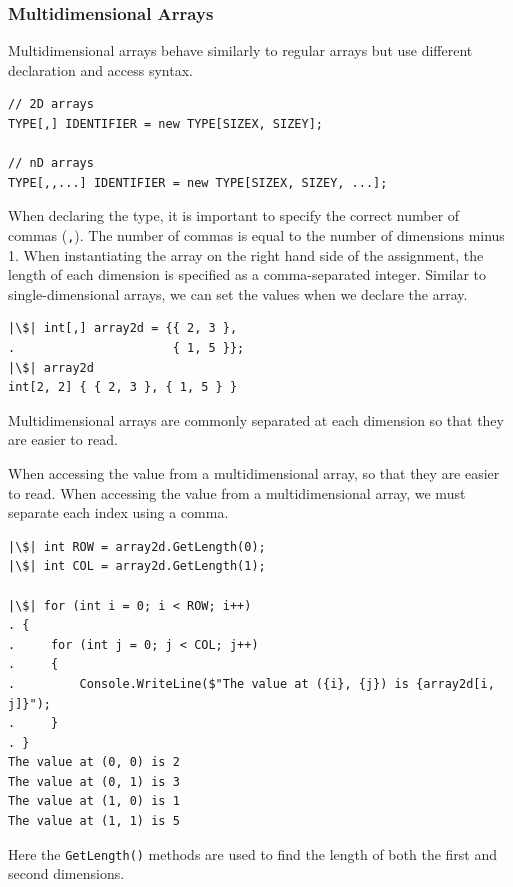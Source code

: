 \documentclass{article}
\begin{document}
\subsubsection{Multidimensional Arrays}
Multidimensional arrays behave similarly to regular arrays but use
different declaration and access syntax.
\begin{verbatim}
// 2D arrays
TYPE[,] IDENTIFIER = new TYPE[SIZEX, SIZEY];

// nD arrays
TYPE[,,...] IDENTIFIER = new TYPE[SIZEX, SIZEY, ...];
\end{verbatim}
When declaring the type, it is important to specify the correct number
of commas (\texttt{,}). The number of commas is equal to
the number of dimensions minus 1. When instantiating the array on the
right hand side of the assignment, the length of each dimension is
specified as a comma-separated integer. Similar to single-dimensional
arrays, we can set the values when we declare the array.
\begin{verbatim}
|\$| int[,] array2d = {{ 2, 3 },
.                      { 1, 5 }};
|\$| array2d
int[2, 2] { { 2, 3 }, { 1, 5 } }
\end{verbatim}
Multidimensional arrays are commonly separated at each dimension so
that they are easier to read.

When accessing the value from a multidimensional array, so that they
are easier to read. When accessing the value from a multidimensional
array, we must separate each index using a comma.
\begin{verbatim}
|\$| int ROW = array2d.GetLength(0);
|\$| int COL = array2d.GetLength(1);

|\$| for (int i = 0; i < ROW; i++)
. {
.     for (int j = 0; j < COL; j++)
.     {
.         Console.WriteLine($"The value at ({i}, {j}) is {array2d[i, j]}");
.     }
. }
The value at (0, 0) is 2
The value at (0, 1) is 3
The value at (1, 0) is 1
The value at (1, 1) is 5
\end{verbatim}
Here the \texttt{GetLength()} methods are used to find the
length of both the first and second dimensions.
\end{document}
